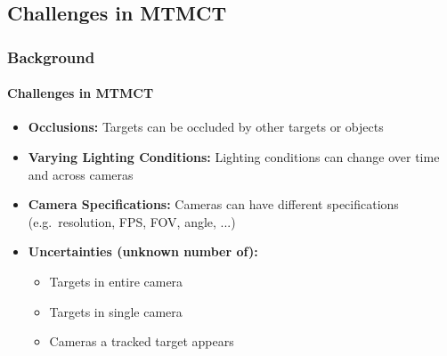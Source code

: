 \subsection{Challenges in MTMCT}
\begin{frame}
    \frametitle{Background}
    \framesubtitle{Challenges in MTMCT}

    \begin{itemize}
        \item<1->\textbf{Occlusions:} Targets can be occluded by other targets or objects
              \vspace{5pt}
        \item<2->\textbf{Varying Lighting Conditions:} Lighting conditions can change over time and across cameras
              \vspace{5pt}
        \item<3->\textbf{Camera Specifications:} Cameras can have different specifications (e.g.~resolution, FPS, FOV, angle, ...)
              \vspace{5pt}
        \item<4->\textbf{Uncertainties (unknown number of):}
              \begin{itemize}
                  \item Targets in entire camera
                  \item Targets in single camera
                  \item Cameras a tracked target appears
              \end{itemize}
    \end{itemize}
\end{frame}

